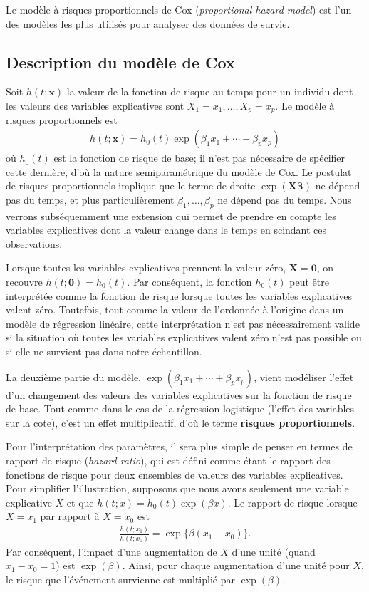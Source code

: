 \documentclass[
  11pt,
  letterpaper,
]{book}
\theoremstyle{definition}
\theoremstyle{definition}
\theoremstyle{definition}
\theoremstyle{definition}
\theoremstyle{remark}
\begin{document}
Le modèle à risques proportionnels de Cox (\emph{proportional hazard model}) est l'un des modèles les plus utilisés pour analyser des données de survie.

\hypertarget{description-du-moduxe8le-de-cox}{%
\subsection{Description du modèle de Cox}\label{description-du-moduxe8le-de-cox}}

Soit \(h(t; \boldsymbol{x})\) la valeur de la fonction de risque au temps pour un individu dont les valeurs des variables explicatives sont \(X_1=x_1, \ldots, X_p=x_p\). Le modèle à risques proportionnels est
\begin{align*}
h(t; \boldsymbol{x}) = h_0(t)\exp(\beta_1x_1 + \cdots + \beta_p x_p)
\end{align*}
où \(h_0(t)\) est la fonction de risque de base; il n'est pas nécessaire de spécifier cette dernière, d'où la nature semiparamétrique du modèle de Cox. Le postulat de risques proportionnels implique que le terme de droite \(\exp(\mathbf{X}\boldsymbol{\beta})\) ne dépend pas du temps, et plus particulièrement \(\beta_1, \ldots, \beta_p\) ne dépend pas du temps. Nous verrons subséquemment une extension qui permet de prendre en compte les variables explicatives dont la valeur change dans le temps en scindant ces observations.

Lorsque toutes les variables explicatives prennent la valeur zéro, \(\boldsymbol{X}=\boldsymbol{0}\), on recouvre \(h(t; \boldsymbol{0})= h_0(t)\). Par conséquent, la fonction \(h_0(t)\) peut être interprétée comme la fonction de risque lorsque toutes les variables explicatives valent zéro. Toutefois, tout comme la valeur de l'ordonnée à l'origine dans un modèle de régression linéaire, cette interprétation n'est pas nécessairement valide si la situation où toutes les variables explicatives valent zéro n'est pas possible ou si elle ne survient pas dans notre échantillon.

La deuxième partie du modèle, \(\exp(\beta_1x_1 + \cdots + \beta_p x_p)\), vient modéliser l'effet d'un changement des valeurs des variables explicatives sur la fonction de risque de base. Tout comme dans le cas de la régression logistique (l'effet des variables sur la cote), c'est un effet multiplicatif, d'où le terme \textbf{risques proportionnels}.

Pour l'interprétation des paramètres, il sera plus simple de penser en termes de rapport de risque (\emph{hazard ratio}), qui est défini comme étant le rapport des fonctions de risque pour deux ensembles de valeurs des variables explicatives. Pour simplifier l'illustration, supposons que nous avons seulement une variable explicative \(X\) et que \(h(t; x) = h_0(t)\exp(\beta x)\). Le rapport de risque lorsque \(X=x_1\) par rapport à \(X=x_0\) est
\begin{align*}
\frac{h(t; x_1)}{h(t; x_0)} = \exp\{\beta(x_1-x_0)\}.
\end{align*}
Par conséquent, l'impact d'une augmentation de \(X\) d'une unité (quand \(x_1-x_0=1\)) est \(\exp(\beta)\). Ainsi, pour chaque augmentation d'une unité pour \(X\), le risque que l'événement survienne est multiplié par \(\exp(\beta)\).
\end{document}
